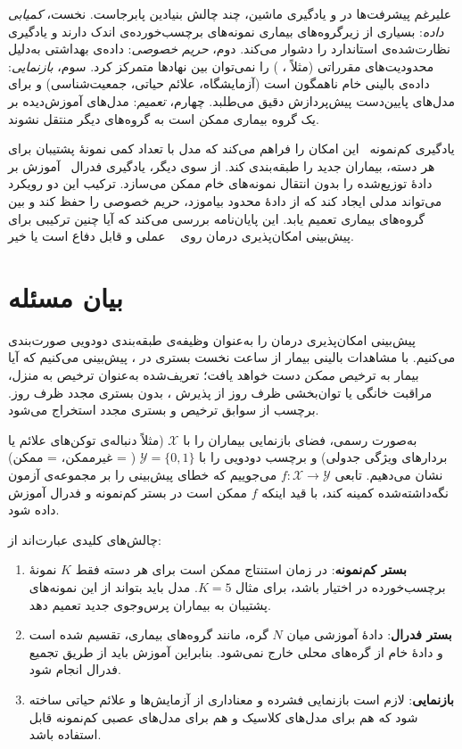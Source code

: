 علیرغم پیشرفت‌ها در  و یادگیری ماشین، چند چالش بنیادین پابرجاست. نخست، \emph{کمیابی داده}: بسیاری از زیرگروه‌های بیماری نمونه‌های برچسب‌خورده‌ی اندک دارند و یادگیری نظارت‌شده‌ی استاندارد را دشوار می‌کند. دوم، \emph{حریم خصوصی}: داده‌ی بهداشتی به‌دلیل محدودیت‌های مقرراتی (مثلاً ، ) را نمی‌توان بین نهادها متمرکز کرد. سوم، \emph{بازنمایی}: داده‌ی بالینی خام ناهمگون است (آزمایشگاه، علائم حیاتی، جمعیت‌شناسی) و برای مدل‌های پایین‌دست پیش‌پردازش دقیق می‌طلبد. چهارم، \emph{تعمیم}: مدل‌های آموزش‌دیده بر یک گروه بیماری ممکن است به گروه‌های دیگر منتقل نشوند.

یادگیری کم‌نمونه~\cite{snell2017prototypical,vinyals2016matching} این امکان را فراهم می‌کند که مدل با تعداد کمی نمونۀ پشتیبان برای هر دسته، بیماران جدید را طبقه‌بندی کند. از سوی دیگر، یادگیری فدرال~\cite{mcmahan2017communication} آموزش بر دادۀ توزیع‌شده را بدون انتقال نمونه‌های خام ممکن می‌سازد. ترکیب این دو رویکرد می‌تواند مدلی ایجاد کند که از دادۀ محدود بیاموزد، حریم خصوصی را حفظ کند و بین گروه‌های بیماری تعمیم یابد. این پایان‌نامه بررسی می‌کند که آیا چنین ترکیبی برای پیش‌بینی امکان‌پذیری درمان روی ~\cite{johnson2023mimic} عملی و قابل دفاع است یا خیر.

\section{بیان مسئله}

پیش‌بینی امکان‌پذیری درمان را به‌عنوان وظیفه‌ی طبقه‌بندی دودویی صورت‌بندی می‌کنیم. با مشاهدات بالینی بیمار از  ساعت نخست بستری در ، پیش‌بینی می‌کنیم که آیا بیمار به ترخیص \emph{ممکن} دست خواهد یافت؛ تعریف‌شده به‌عنوان ترخیص به منزل، مراقبت خانگی یا توان‌بخشی ظرف  روز از پذیرش ، بدون بستری مجدد ظرف  روز. برچسب از سوابق ترخیص و بستری مجدد  استخراج می‌شود.

به‌صورت رسمی، فضای بازنمایی بیماران را با $\mathcal{X}$ (مثلاً دنباله‌ی توکن‌های علائم یا بردارهای ویژگی جدولی) و برچسب دودویی را با $\mathcal{Y} = \{0, 1\}$ ( = غیرممکن،  = ممکن) نشان می‌دهیم. تابعی $f: \mathcal{X} \to \mathcal{Y}$ می‌جوییم که خطای پیش‌بینی را بر مجموعه‌ی آزمون نگه‌داشته‌شده کمینه کند، با قید اینکه $f$ ممکن است در بستر کم‌نمونه و فدرال آموزش داده شود.

چالش‌های کلیدی عبارت‌اند از:
\begin{enumerate}
\item \textbf{بستر کم‌نمونه}: در زمان استنتاج ممکن است برای هر دسته فقط $K$ نمونۀ برچسب‌خورده در اختیار باشد، برای مثال $K=5$. مدل باید بتواند از این نمونه‌های پشتیبان به بیماران پرس‌وجوی جدید تعمیم دهد.
\item \textbf{بستر فدرال}: دادۀ آموزشی میان $N$ گره، مانند گروه‌های بیماری، تقسیم شده است و دادۀ خام از گره‌های محلی خارج نمی‌شود. بنابراین آموزش باید از طریق تجمیع فدرال انجام شود.
\item \textbf{بازنمایی}: لازم است بازنمایی فشرده و معناداری از آزمایش‌ها و علائم حیاتی ساخته شود که هم برای مدل‌های کلاسیک و هم برای مدل‌های عصبی کم‌نمونه قابل استفاده باشد.
\end{enumerate}

